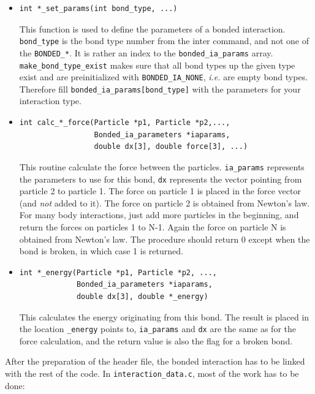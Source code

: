 \documentclass[
a4paper,                        %
11pt,                           %
twoside,                        %
footsepline,                    %
headsepline,                    %
headexclude,                    %
footexclude,                    %
pagesize,                       %
bibtotocnumbered,               %
idxtotoc                        %
]{scrreprt}
\newcommand{\ie}{\textit{i.e.}\xspace}
\begin{document}
\begin{itemize}
\item 
\begin{verbatim}
int *_set_params(int bond_type, ...)
\end{verbatim}
  This function is used to define the parameters of a bonded
  interaction. \verb!bond_type! is the bond type number from the inter
  command, and not one of the \verb!BONDED_*!. It is rather an index
  to the \verb!bonded_ia_params! array. \verb!make_bond_type_exist!
  makes sure that all bond types up the given type exist and are
  preinitialized with \verb!BONDED_IA_NONE!, \ie are empty bond
  types. Therefore fill \verb!bonded_ia_params[bond_type]! with the
  parameters for your interaction type.
\item
\begin{verbatim}
int calc_*_force(Particle *p1, Particle *p2,..., 
                 Bonded_ia_parameters *iaparams, 
                 double dx[3], double force[3], ...)
\end{verbatim}
  This routine calculate the force between the
  particles. \verb!ia_params!  represents the parameters to use for
  this bond, \verb!dx! represents the vector pointing from particle 2
  to particle 1.  The force on particle 1 is placed in the force
  vector (and \emph{not} added to it). The force on particle 2 is
  obtained from Newton's law. For many body interactions, just add
  more particles in the beginning, and return the forces on particles
  1 to N-1. Again the force on particle N is obtained from Newton's
  law. The procedure should return 0 except when the bond is broken,
  in which case 1 is returned.

\item 
\begin{verbatim}
int *_energy(Particle *p1, Particle *p2, ..., 
             Bonded_ia_parameters *iaparams, 
             double dx[3], double *_energy)
\end{verbatim}
  This calculates the energy originating from this bond. The result is
  placed in the location \verb!_energy! points to, \verb!ia_params!
  and \verb!dx! are the same as for the force calculation, and the
  return value is also the flag for a broken bond.
\end{itemize}

After the preparation of the header file, the bonded interaction has
to be linked with the rest of the code. In
\verb!interaction_data.c!, most of the work has to be done:
\end{document}
